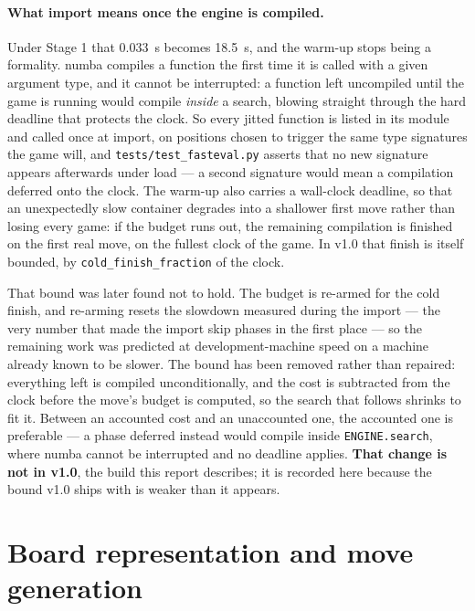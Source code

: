 \documentclass[11pt,a4paper]{article}
\newcommand{\code}[1]{\texttt{#1}}
\begin{document}
\paragraph{What import means once the engine is compiled.} Under Stage 1 that 0.033~s becomes 18.5~s,
and the warm-up stops being a formality. numba compiles a function the first time it is called with a
given argument type, and it cannot be interrupted: a function left uncompiled until the game is running
would compile \emph{inside} a search, blowing straight through the hard deadline that protects the clock.
So every jitted function is listed in its module and called once at import, on positions chosen to
trigger the same type signatures the game will, and \code{tests/test\_fasteval.py} asserts that no new
signature appears afterwards under load --- a second signature would mean a compilation deferred onto the
clock. The warm-up also carries a wall-clock deadline, so that an unexpectedly slow container degrades
into a shallower first move rather than losing every game: if the budget runs out, the remaining
compilation is finished on the first real move, on the fullest clock of the game. In v1.0 that finish
is itself bounded, by \code{cold\_finish\_fraction} of the clock.

That bound was later found not to hold. The budget is re-armed for the cold finish, and re-arming
resets the slowdown measured during the import --- the very number that made the import skip phases in
the first place --- so the remaining work was predicted at development-machine speed on a machine
already known to be slower. The bound has been removed rather than repaired: everything left is
compiled unconditionally, and the cost is subtracted from the clock before the move's budget is
computed, so the search that follows shrinks to fit it. Between an accounted cost and an unaccounted
one, the accounted one is preferable --- a phase deferred instead would compile inside
\code{ENGINE.search}, where numba cannot be interrupted and no deadline applies. \textbf{That change is
not in v1.0}, the build this report describes; it is recorded here because the bound v1.0 ships with is
weaker than it appears.

\section{Board representation and move generation}\label{sec:board}
\end{document}
